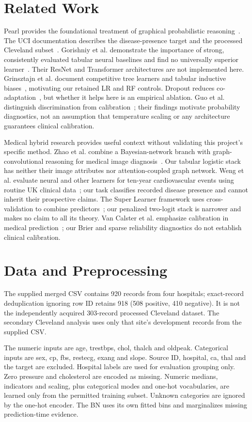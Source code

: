 \documentclass[conference]{IEEEtran}
\begin{document}
\section{Related Work}
Pearl provides the foundational treatment of graphical probabilistic reasoning~\cite{pearl}. The UCI documentation describes the disease-presence target and the processed Cleveland subset~\cite{uci}. Gorishniy et al. demonstrate the importance of strong, consistently evaluated tabular neural baselines and find no universally superior learner~\cite{gorishniy}. Their ResNet and Transformer architectures are not implemented here. Grinsztajn et al. document competitive tree learners and tabular inductive biases~\cite{grinsztajn}, motivating our retained LR and RF controls. Dropout reduces co-adaptation~\cite{dropout}, but whether it helps here is an empirical ablation. Guo et al. distinguish discrimination from calibration~\cite{guo}; their findings motivate probability diagnostics, not an assumption that temperature scaling or any architecture guarantees clinical calibration.

Medical hybrid research provides useful context without validating this project's specific method. Zhao et al. combine a Bayesian-network branch with graph-convolutional reasoning for medical image diagnosis~\cite{zhao}. Our tabular logistic stack has neither their image attributes nor attention-coupled graph network. Weng et al. evaluate neural and other learners for ten-year cardiovascular events using routine UK clinical data~\cite{weng}; our task classifies recorded disease presence and cannot inherit their prospective claims. The Super Learner framework uses cross-validation to combine predictors~\cite{superlearner}; our penalized two-logit stack is narrower and makes no claim to all its theory. Van Calster et al. emphasize calibration in medical prediction~\cite{vancalster}; our Brier and sparse reliability diagnostics do not establish clinical calibration.

\section{Data and Preprocessing}
The supplied merged CSV contains 920 records from four hospitals; exact-record deduplication ignoring row ID retains 918 (508 positive, 410 negative). It is not the independently acquired 303-record processed Cleveland dataset. The secondary Cleveland analysis uses only that site's development records from the supplied CSV.

The numeric inputs are age, trestbps, chol, thalch and oldpeak. Categorical inputs are sex, cp, fbs, restecg, exang and slope. Source ID, hospital, ca, thal and the target are excluded. Hospital labels are used for evaluation grouping only. Zero pressure and cholesterol are encoded as missing. Numeric medians, indicators and scaling, plus categorical modes and one-hot vocabularies, are learned only from the permitted training subset. Unknown categories are ignored by the one-hot encoder. The BN uses its own fitted bins and marginalizes missing prediction-time evidence.
\end{document}
